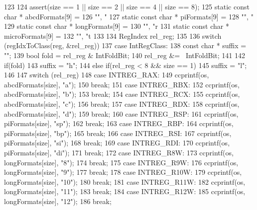 \begin{DoxyCode}
123     {
124         assert(size == 1 || size == 2 || size == 4 || size == 8);
125         static const char * abcdFormats[9] =
126             {"", "%
127         static const char * piFormats[9] =
128             {"", "%
129         static const char * longFormats[9] =
130             {"", "r%
131         static const char * microFormats[9] =
132             {"", "t%
133 
134         RegIndex rel_reg;
135 
136         switch (regIdxToClass(reg, &rel_reg)) {
137           case IntRegClass: {
138             const char * suffix = "";
139             bool fold = rel_reg & IntFoldBit;
140             rel_reg &= ~IntFoldBit;
141 
142             if(fold)
143                 suffix = "h";
144             else if(rel_reg < 8 && size == 1)
145                 suffix = "l";
146 
147             switch (rel_reg) {
148               case INTREG_RAX:
149                 ccprintf(os, abcdFormats[size], "a");
150                 break;
151               case INTREG_RBX:
152                 ccprintf(os, abcdFormats[size], "b");
153                 break;
154               case INTREG_RCX:
155                 ccprintf(os, abcdFormats[size], "c");
156                 break;
157               case INTREG_RDX:
158                 ccprintf(os, abcdFormats[size], "d");
159                 break;
160               case INTREG_RSP:
161                 ccprintf(os, piFormats[size], "sp");
162                 break;
163               case INTREG_RBP:
164                 ccprintf(os, piFormats[size], "bp");
165                 break;
166               case INTREG_RSI:
167                 ccprintf(os, piFormats[size], "si");
168                 break;
169               case INTREG_RDI:
170                 ccprintf(os, piFormats[size], "di");
171                 break;
172               case INTREG_R8W:
173                 ccprintf(os, longFormats[size], "8");
174                 break;
175               case INTREG_R9W:
176                 ccprintf(os, longFormats[size], "9");
177                 break;
178               case INTREG_R10W:
179                 ccprintf(os, longFormats[size], "10");
180                 break;
181               case INTREG_R11W:
182                 ccprintf(os, longFormats[size], "11");
183                 break;
184               case INTREG_R12W:
185                 ccprintf(os, longFormats[size], "12");
186                 break;
}}}}}}}}
\end{DoxyCode}
